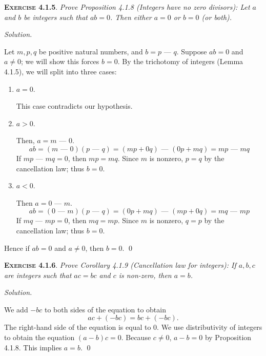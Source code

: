 \documentclass[12pt]{article}
\newcommand{\minus}{\textrm{ --- }}
\theoremstyle{remark}
\newenvironment{exer}[2]{
    \noindent \setlength{\parskip}{1em}%
    \textsc{\textbf{Exercise #1}}. \textit{#2} \par
    \noindent \textit{Solution.} %
}{\bigskip}
\begin{document}
\begin{exer}{4.1.5}{
    Prove Proposition 4.1.8 (Integers have no zero divisors):
    Let $a$ and $b$ be integers such that $ab = 0$.
    Then either $a = 0$ or $b = 0$ (or both).
}
    Let $m, p, q$ be positive natural numbers, and $b = p \minus q$.
    Suppose $ab = 0$ and $a \ne 0$; we will show this forces $b = 0$.
    By the trichotomy of integers (Lemma 4.1.5), we will split into three cases:
    \begin{enumerate}[topsep=0mm,label=(\alph*)]
        \item $a = 0$.
        
            This case contradicts our hypothesis.
            
        \item $a > 0$.

            Then, $a = m \minus 0$.
            \[
                ab = (m \minus 0)(p \minus q) = (mp + 0q)\minus (0p + mq) = mp \minus mq
            \]
            If $mp \minus mq = 0$, then $mp = mq$.
            Since $m$ is nonzero, $p = q$ by the cancellation law; thus $b = 0$.

        \item $a < 0$.

            Then $a = 0 \minus m$.
            \[
                ab = (0 \minus m)(p \minus q) = (0p + mq)\minus (mp + 0q) = mq \minus mp
            \]
            If $mq \minus mp = 0$, then $mq = mp$.
            Since $m$ is nonzero, $q = p$ by the cancellation law; thus $b = 0$.
    \end{enumerate}

    Hence if $ab = 0$ and $a \ne 0$, then $b = 0$. \qed
\end{exer}


\begin{exer}{4.1.6}{
    Prove Corollary 4.1.9 (Cancellation law for integers):
    If $a, b, c$ are integers such that $ac = bc$ and $c$ is non-zero, then $a = b$.
}
    We add $-bc$ to both sides of the equation to obtain
    \[
        ac + (-bc) = bc + (-bc).
    \]
    The right-hand side of the equation is equal to $0$.
    We use distributivity of integers to obtain the equation $(a - b)c = 0$.
    Because $c \ne 0$, $a - b = 0$ by Proposition 4.1.8.
    This implies $a = b$. \qed
\end{exer}
\end{document}
